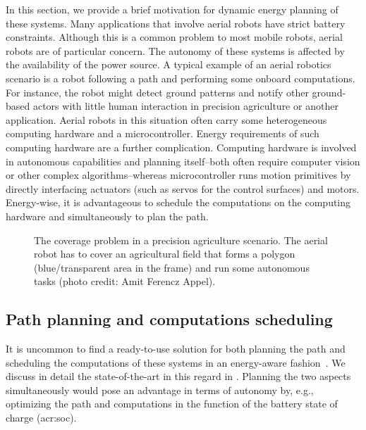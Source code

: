 In this section, we provide a brief motivation for dynamic energy planning of these systems.
Many applications that involve aerial robots have strict battery constraints. Although this is a common problem to most mobile robots, aerial robots are of particular concern. The autonomy of these systems is affected by the availability of the power source. A typical example of an aerial robotics scenario is a robot following a path and performing some onboard computations. For instance, the robot might detect ground patterns and notify other ground-based actors with little human interaction in precision agriculture or another application. Aerial robots in this situation often carry some heterogeneous computing hardware and a microcontroller. Energy requirements of such computing hardware are a further complication. Computing hardware is involved in autonomous capabilities and planning itself--both often require computer vision or other complex algorithms--whereas microcontroller runs motion primitives by directly interfacing actuators (such as servos for the control surfaces) and motors. Energy-wise, it is advantageous to schedule the computations on the computing hardware and simultaneously to plan the path.

\begin{figure}[t!]
  \sfr
  \centering
  
  \caption[The coverage problem in a precision agriculture scenario]{The coverage problem in a precision agriculture scenario. The aerial robot has to cover an agricultural field that forms a polygon (blue/transparent area in the frame) and run some autonomous tasks {\scriptsize(photo credit: Amit Ferencz Appel)}.}
  \label{fig:plot2}
  \efr
\end{figure} %

\subsection{Path planning and computations scheduling}

It is uncommon to find a ready-to-use solution for both planning the path and scheduling the computations of these systems in an energy-aware fashion~\citep{brateman2006energy,sudhakar2020balancing}. We discuss in detail the state-of-the-art in this regard in . Planning the two aspects simultaneously would pose an advantage in terms of autonomy by, e.g., optimizing the path and computations in the function of the battery state of charge (\Gls{acr:soc}). 

